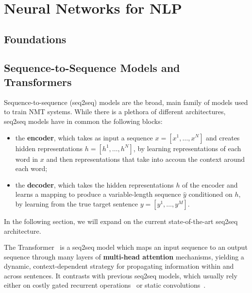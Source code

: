 \section{Neural Networks for NLP}
\label{sec:nmt}

\subsection{Foundations}

\subsection{Sequence-to-Sequence Models and Transformers}
\label{sec:transformer_bg}

Sequence-to-sequence (seq2seq) models are the broad, main family of models
used to train NMT systems. While there is a plethora of different architectures,
seq2seq models have in common the following blocks:

\begin{itemize}
    \item the {\bf encoder}, which takes as input a sequence $x=[x^1,
              \dots, x^N]$ and creates hidden representations $h=[h^1, \dots,
              h^N]$, by learning representations of each word in $x$ and then
          representations that take into accoun the context around each word;
    \item the {\bf decoder}, which takes the hidden representations
          $h$ of the encoder and learns a mapping to produce a
          variable-length sequence $\hat{y}$ conditioned on $h$, by
          learning from the true target sentence $y=[y^1, \dots, y^M]$.
\end{itemize}

In the following section, we will expand on the current
state-of-the-art seq2seq architecture.

The Transformer~\citep{vaswani2017attention} is a
seq2seq model which maps an input sequence to
an output sequence through many layers of \textbf{multi-head
    attention} mechanisms, yielding a dynamic, context-dependent strategy
for propagating information within and across sentences. It contrasts
with previous seq2seq models, which usually rely either on costly
gated recurrent operations~\citep[often
    LSTMs:][]{bahdanau2014neural,luong2015effective} or static
convolutions~\citep{convseq}.

